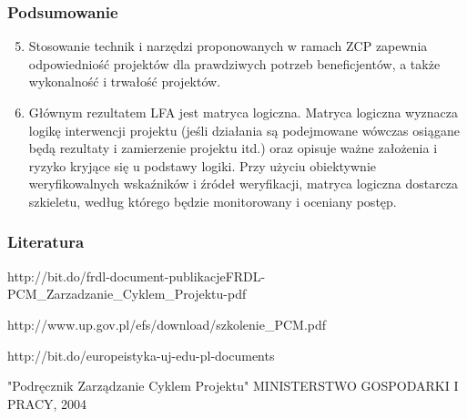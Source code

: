 \documentclass{beamer}
\begin{document}
\begin{frame}\frametitle{Podsumowanie}
	\begin{enumerate}
	   \setcounter{enumi}{4}
	   
        \item Stosowanie technik i narzędzi proponowanych w ramach ZCP zapewnia odpowiedniość projektów dla prawdziwych potrzeb beneficjentów, a także wykonalność i trwałość projektów. 

        \item Głównym rezultatem LFA jest matryca logiczna. Matryca logiczna wyznacza logikę interwencji projektu (jeśli działania są podejmowane wówczas osiągane będą rezultaty i zamierzenie projektu itd.) oraz opisuje ważne założenia i ryzyko kryjące się u podstawy logiki. Przy użyciu obiektywnie weryfikowalnych wskaźników i źródeł weryfikacji, matryca logiczna dostarcza szkieletu, według którego będzie monitorowany i oceniany postęp.


	\end{enumerate}
\end{frame}

\begin{frame}\frametitle{Literatura}

    \begin{thebibliography}{1}

        \bibitem{} http://bit.do/frdl-document-publikacjeFRDL-PCM\_Zarzadzanie\_Cyklem\_Projektu-pdf
        
        \bibitem{} http://www.up.gov.pl/efs/download/szkolenie\_PCM.pdf
        
        \bibitem{} http://bit.do/europeistyka-uj-edu-pl-documents
    
        \bibitem{} "Podręcznik Zarządzanie Cyklem Projektu" MINISTERSTWO GOSPODARKI I PRACY, 2004  
    
    \end{thebibliography}
         

\end{frame}
\end{document}
